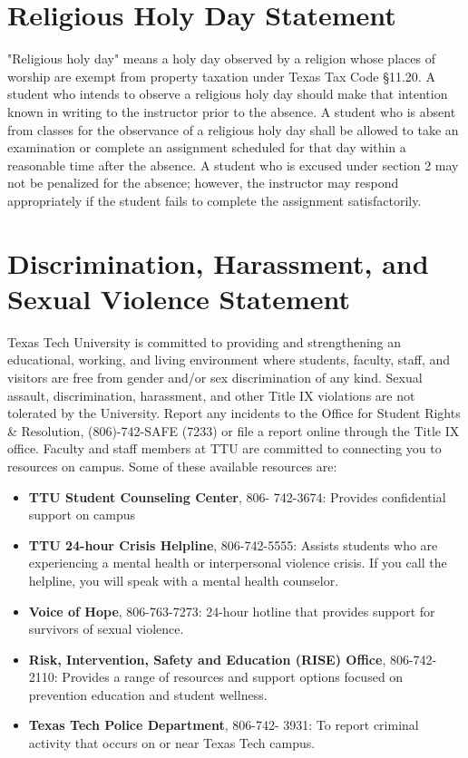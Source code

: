 \documentclass[12pt, notitlepage]{article}   	%
\begin{document}
{\section{Religious Holy Day Statement}
"Religious holy day" means a holy day observed by a religion whose places of worship are exempt from property taxation under Texas Tax Code §11.20. A student who intends to observe a religious holy day should make that intention known in writing to the instructor prior to the absence. A student who is absent from classes for the observance of a religious holy day shall be allowed to take an examination or complete an assignment scheduled for that day within a reasonable time after the absence. A student who is excused under section 2 may not be penalized for the absence; however, the instructor may respond appropriately if the student fails to complete the assignment satisfactorily.

\section{Discrimination, Harassment, and Sexual Violence Statement}
Texas Tech University is committed to providing and strengthening an educational, working, and living environment where students, faculty, staff, and visitors are free from gender and/or sex discrimination of any kind. Sexual assault, discrimination, harassment, and other Title IX violations are not tolerated by the University. Report any incidents to the Office for Student Rights \& Resolution, (806)-742-SAFE (7233) or file a report online through the Title IX office. Faculty and staff members at TTU are committed to connecting you to resources on campus. Some of these available resources are:
\begin{itemize}
    \item \textbf{TTU Student Counseling Center}, 806- 742-3674: Provides confidential support on campus
    \item \textbf{TTU 24-hour Crisis Helpline}, 806-742-5555: Assists students who are experiencing a mental health or interpersonal violence crisis. If you call the helpline, you will speak with a mental health counselor.
    \item \textbf{Voice of Hope}, 806-763-7273: 24-hour hotline that provides support for survivors of sexual violence.
    \item \textbf{Risk, Intervention, Safety and Education (RISE) Office}, 806-742-2110: Provides a range of resources and support options focused on prevention education and student wellness.
    \item \textbf{Texas Tech Police Department}, 806-742- 3931: To report criminal activity that occurs on or near Texas Tech campus.
\end{itemize}

}
\end{document}
